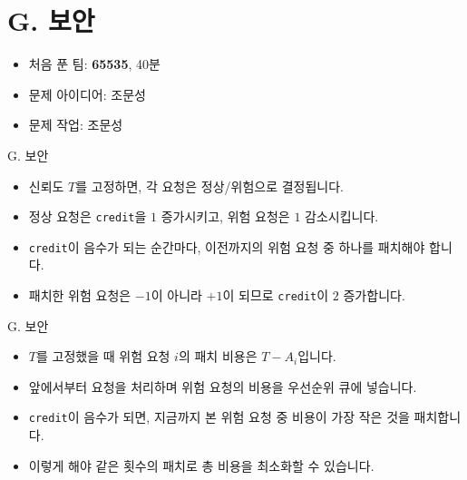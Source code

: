 \def\probno{G}
\def\probtitle{보안}

\section{\probno{}. \probtitle{}}

\begin{frame}
    \sectiontitle{\probno{}}{\probtitle{}}
    \begin{itemize}
        \item 처음 푼 팀: \textbf{65535}, 40분
        \item 문제 아이디어: 조문성
        \item 문제 작업: 조문성
    \end{itemize}
\end{frame}

\begin{frame}{\probno{}. \probtitle{}}
    \begin{itemize}
        \item 신뢰도 $T$를 고정하면, 각 요청은 정상/위험으로 결정됩니다.
        \item 정상 요청은 \texttt{credit}을 $1$ 증가시키고, 위험 요청은 $1$ 감소시킵니다.
        \item \texttt{credit}이 음수가 되는 순간마다, 이전까지의 위험 요청 중 하나를 패치해야 합니다.
        \item 패치한 위험 요청은 $-1$이 아니라 $+1$이 되므로 \texttt{credit}이 $2$ 증가합니다.
    \end{itemize}
\end{frame}

\begin{frame}{\probno{}. \probtitle{}}
    \begin{itemize}
        \item $T$를 고정했을 때 위험 요청 $i$의 패치 비용은 $T-A_i$입니다.
        \item 앞에서부터 요청을 처리하며 위험 요청의 비용을 우선순위 큐에 넣습니다.
        \item \texttt{credit}이 음수가 되면, 지금까지 본 위험 요청 중 비용이 가장 작은 것을 패치합니다.
        \item 이렇게 해야 같은 횟수의 패치로 총 비용을 최소화할 수 있습니다.
    \end{itemize}
\end{frame}

